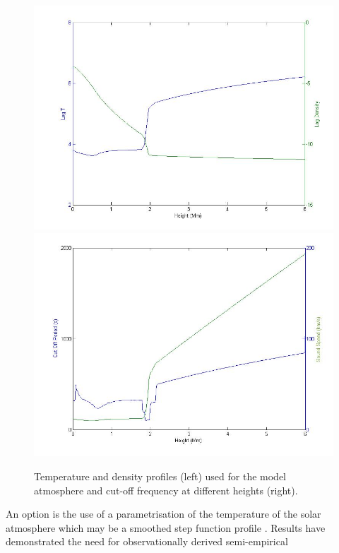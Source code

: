 \documentclass[preprint,authoryear,12pt]{elsarticle}
\begin{document}
\begin{figure}[h]
\begin{center}
\mbox{\includegraphics[scale=0.24]{images/VAL3C_rho_temp_fig2.jpg}}  
\mbox{\includegraphics[scale=0.24]{images/soundspeedVAL3C_profile_fig3.jpg}}
\par
\end{center}
\caption{Temperature and density profiles (left) used for the model atmosphere and cut-off frequency at different heights (right).}
\label{Fig1}
\end{figure}
An option is the use of a parametrisation of the temperature of the solar atmosphere which may be a smoothed step 
function profile  \citet{Murawski2010}. Results have demonstrated the need for observationally derived semi-empirical 
\end{document}
